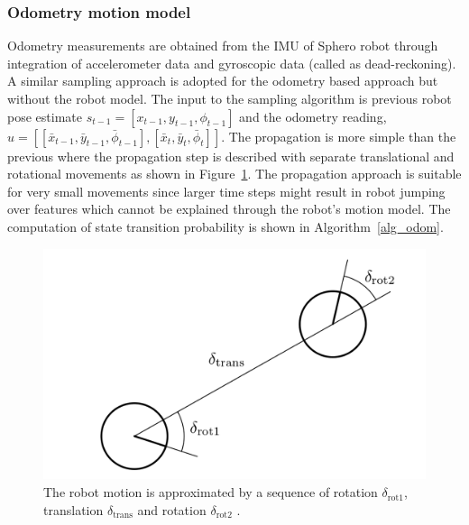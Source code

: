 \subsubsection{Odometry motion model}
Odometry measurements are obtained from the IMU of Sphero robot through integration of accelerometer data and gyroscopic data (called as dead-reckoning). A similar sampling approach is adopted for the odometry based approach but without the robot model. The input to the sampling algorithm is previous robot pose estimate $s_{t-1}=[x_{t-1},y_{t-1},\phi_{t-1}]$ and the odometry reading, $u=[[\bar{x}_{t-1},\bar{y}_{t-1},\bar{\phi}_{t-1}],[\bar{x}_{t},\bar{y}_{t},\bar{\phi}_{t}]]$. The propagation is more simple than the previous where the propagation step is described with separate translational and rotational movements as shown in Figure~\ref{odometry_motion}. The propagation approach is suitable for very small movements since larger time steps might result in robot jumping over features which cannot be explained through the robot's motion model. The computation of state transition probability is shown in Algorithm~\ref{alg_odom}.

\begin{figure}
\centering
\includegraphics[scale=0.2]{./images/odometry_motion}
\caption[Approximation of robot motion in odometry model]{The robot motion is approximated by a sequence of rotation $\delta_{\text{rot1}}$, translation $\delta_{\text{trans}}$ and rotation $\delta_{\text{rot2}}$ \cite{thrun2005probabilistic}.}
\label{odometry_motion}
\end{figure}

